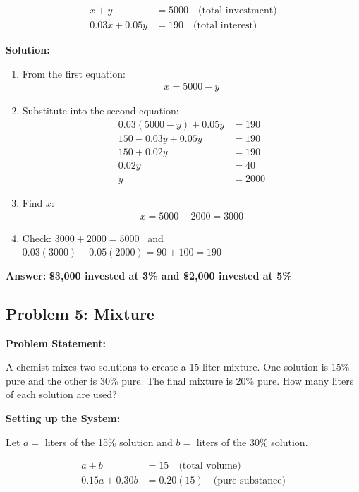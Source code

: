 \documentclass{article}
\begin{document}
\begin{align*}
x + y &= 5000 \quad \text{(total investment)} \\
0.03x + 0.05y &= 190 \quad \text{(total interest)}
\end{align*}

\textbf{Solution:}

\begin{enumerate}
    \item From the first equation:
    \begin{align*}
        x = 5000 - y
    \end{align*}
    \item Substitute into the second equation:
    \begin{align*}
        0.03(5000 - y) + 0.05y &= 190 \\
        150 - 0.03y + 0.05y &= 190 \\
        150 + 0.02y &= 190 \\
        0.02y &= 40 \\
        y &= 2000
    \end{align*}
    \item Find $x$:
    \begin{align*}
        x = 5000 - 2000 = 3000
    \end{align*}
    \item Check: $3000 + 2000 = 5000$ \,  and $0.03(3000) + 0.05(2000) = 90 + 100 = 190$ \, 
\end{enumerate}

\textbf{Answer:} \textbf{\$3,000 invested at 3\% and \$2,000 invested at 5\%} \,  

\subsection{Problem 5: Mixture}

\textbf{Problem Statement:}

A chemist mixes two solutions to create a 15-liter mixture. One solution is 15\% pure and the other is 30\% pure. The final mixture is 20\% pure. How many liters of each solution are used?

\textbf{Setting up the System:}

Let $a =$ liters of the 15\% solution and $b =$ liters of the 30\% solution.

\begin{align*}
a + b &= 15 \quad \text{(total volume)} \\
0.15a + 0.30b &= 0.20(15) \quad \text{(pure substance)}
\end{align*}
\end{document}
